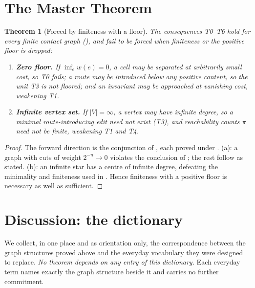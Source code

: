 \documentclass[11pt,a4paper]{article}
\theoremstyle{thmstyle}
\newtheorem{theorem}{Theorem}[section]
\theoremstyle{definition}
\theoremstyle{remark}
\newcommand{\V}{V}
\newcommand{\wt}{w}
\newcommand{\abs}[1]{\lvert#1\rvert}
\begin{document}
\section{The Master Theorem}
\label{sec:master}

\begin{theorem}[Forced by finiteness with a floor]
\label{thm:master}
The consequences T0--T6 hold for every finite contact graph
\textup{(}\textup{)}, and fail to be forced when finiteness
or the positive floor is dropped:
\begin{enumerate}[label=\textup{(\alph*)},leftmargin=2.2em]
\item \textbf{Zero floor.} If $\inf_e\wt(e)=0$, a cell may be separated at
arbitrarily small cost, so T0 fails; a route may be introduced below any
positive content, so the unit T3 is not floored; and an invariant may be
approached at vanishing cost, weakening T1.
\item \textbf{Infinite vertex set.} If $\abs{\V}=\infty$, a vertex may have
infinite degree, so a minimal route-introducing edit need not exist (T3),
and reachability counts $\pi$ need not be finite, weakening T1 and T4.
\end{enumerate}
\end{theorem}

\begin{proof}
The forward direction is the conjunction of
, each proved under
. (a): a graph with cuts of weight $2^{-n}\to0$ violates the
conclusion of ; the rest follow as stated. (b): an infinite
star has a centre of infinite degree, defeating the minimality and finiteness
used in . Hence finiteness with a
positive floor is necessary as well as sufficient.
\end{proof}

\section{Discussion: the dictionary}
\label{sec:dict}

We collect, in one place and as orientation only, the correspondence between
the graph structures proved above and the everyday vocabulary they were
designed to replace. \emph{No theorem depends on any entry of this
dictionary.} Each everyday term names exactly the graph structure beside it
and carries no further commitment.
\end{document}
